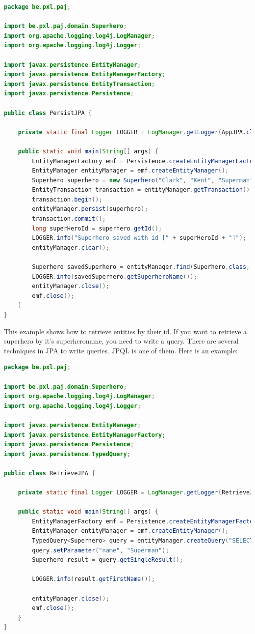 \begin{lstlisting}[frame=single, language=java]
package be.pxl.paj;

import be.pxl.paj.domain.Superhero;
import org.apache.logging.log4j.LogManager;
import org.apache.logging.log4j.Logger;

import javax.persistence.EntityManager;
import javax.persistence.EntityManagerFactory;
import javax.persistence.EntityTransaction;
import javax.persistence.Persistence;

public class PersistJPA {

	private static final Logger LOGGER = LogManager.getLogger(AppJPA.class);

	public static void main(String[] args) {
		EntityManagerFactory emf = Persistence.createEntityManagerFactory("musicdb_pu");
		EntityManager entityManager = emf.createEntityManager();
		Superhero superhero = new Superhero("Clark", "Kent", "Superman");
		EntityTransaction transaction = entityManager.getTransaction();
		transaction.begin();
		entityManager.persist(superhero);
		transaction.commit();
		long superHeroId = superhero.getId();
		LOGGER.info("Superhero saved with id [" + superHeroId + "]");
		entityManager.clear();

		Superhero savedSuperhero = entityManager.find(Superhero.class, superHeroId);
		LOGGER.info(savedSuperhero.getSuperheroName());
		entityManager.close();
		emf.close();
	}
}
\end{lstlisting}

This example shows how to retrieve entities by their id.  If you want to retrieve a superhero by it's superheroname, you need to write a query. There are several techniques in JPA to write queries. JPQL is one of them. Here is an example:

\begin{lstlisting}[frame=single,language=java]
package be.pxl.paj;

import be.pxl.paj.domain.Superhero;
import org.apache.logging.log4j.LogManager;
import org.apache.logging.log4j.Logger;

import javax.persistence.EntityManager;
import javax.persistence.EntityManagerFactory;
import javax.persistence.Persistence;
import javax.persistence.TypedQuery;

public class RetrieveJPA {

	private static final Logger LOGGER = LogManager.getLogger(RetrieveJPA.class);

	public static void main(String[] args) {
		EntityManagerFactory emf = Persistence.createEntityManagerFactory("musicdb_pu");
		EntityManager entityManager = emf.createEntityManager();
		TypedQuery<Superhero> query = entityManager.createQuery("SELECT s FROM Superhero s WHERE s.superheroName = :name", Superhero.class);;
		query.setParameter("name", "Superman");
		Superhero result = query.getSingleResult();

		LOGGER.info(result.getFirstName());

		entityManager.close();
		emf.close();
	}
}
\end{lstlisting}



